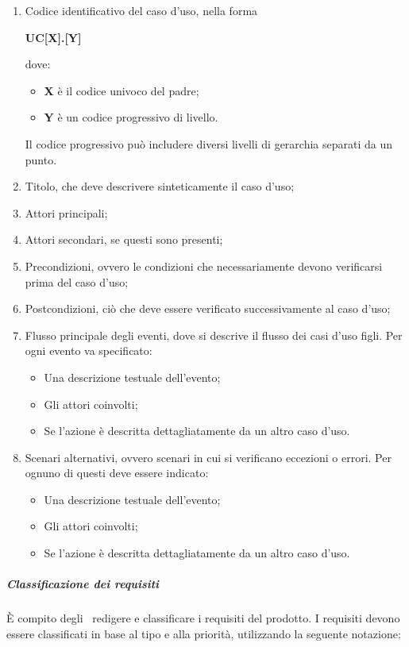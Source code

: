 \documentclass[../NormeProgetto.tex]{subfiles}
\begin{document}
				\begin{enumerate}
					\item Codice identificativo del caso d'uso, nella forma \begin{center}\textbf{UC[X].[Y]}\end{center} dove:
					\begin{itemize}
						\item \textbf{X} è il codice univoco del padre;
						\item \textbf{Y} è un codice progressivo di livello.
					\end{itemize}
					Il codice progressivo può includere diversi livelli di gerarchia separati da un punto.
					\item Titolo, che deve descrivere sinteticamente il caso d'uso;
					\item Attori principali;
					\item Attori secondari, se questi sono presenti;
					\item Precondizioni, ovvero le condizioni che necessariamente devono verificarsi prima del caso d'uso;
					\item Postcondizioni, ciò che deve essere verificato successivamente al caso d'uso;
					\item Flusso principale degli eventi, dove si descrive il flusso dei casi d'uso figli. Per ogni evento va specificato:
					\begin{itemize}
						\item Una descrizione testuale dell'evento;
						\item Gli attori coinvolti;
						\item Se l'azione è descritta dettagliatamente da un altro caso d'uso.
					\end{itemize}
					\item Scenari alternativi, ovvero scenari in cui si verificano eccezioni o errori. Per ognuno di questi deve essere indicato:
						\begin{itemize}
							\item Una descrizione testuale dell'evento;
							\item Gli attori coinvolti;
							\item Se l'azione è descritta dettagliatamente da un altro caso d'uso.
						\end{itemize}
				\end{enumerate}
				\subparagraph{Classificazione dei requisiti}
				È compito degli \analisti\ redigere e classificare i requisiti del prodotto.  I requisiti devono essere classificati in base al tipo e alla priorità, utilizzando la seguente notazione:
\end{document}
